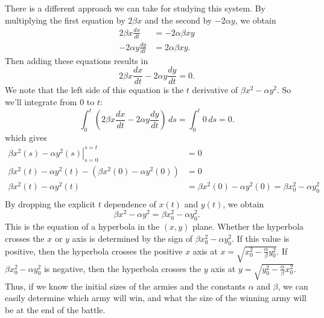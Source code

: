 \documentclass[reqno]{immbook}
\numberwithin{equation}{chapter}
\numberwithin{question}{section}
\numberwithin{theorem}{chapter}
\numberwithin{figure}{chapter}
\theoremstyle{definition}
\begin{document}
There is a different approach we can take for studying
this system.
By multiplying the first equation by $2\beta x$ and the
second by $-2\alpha y$, we obtain
\begin{equation}
\begin{split}
 2\beta x\frac{dx}{dt} & = -2 \alpha \beta x y \\
 -2\alpha y\frac{dy}{dt} & = 2 \alpha \beta x y.
\end{split}
\end{equation}
Then adding these equations results in
\begin{equation}
   2\beta x\frac{dx}{dt} -2\alpha y\frac{dy}{dt} = 0.
\end{equation}
We note that the left side of this equation is
the $t$ derivative of $\beta x^2 - \alpha y^2$.
So we'll integrate from $0$ to $t$:
\begin{equation}
   \int_0^t \left(2\beta x\frac{dx}{dt} -2\alpha y\frac{dy}{dt}\right)\, ds = \int_0^t 0 \, ds = 0.
\end{equation}
which gives
\begin{equation}
\begin{split}
  \left.\beta x^2(s) - \alpha y^2(s)\right|_{s=0}^{s=t} & = 0 \\
   \beta x^2(t) - \alpha y^2(t) - (\beta x^2(0) - \alpha y^2(0)) & = 0 \\
      \beta x^2(t) - \alpha y^2(t) & = \beta x^2(0) - \alpha y^2(0) =
         \beta x_0^2 - \alpha y_0^2 \\
\end{split}
\end{equation}
By dropping the explicit $t$ dependence of $x(t)$
and $y(t)$, we obtain
\begin{equation}
   \beta x^2 - \alpha y^2 = \beta x_0^2 - \alpha y_0^2.
   \label{eqn:lanchester_hyperbola}
\end{equation}
This is the equation of a hyperbola in the $(x,y)$ plane.
Whether the hyperbola crosses the $x$ or $y$ axis is
determined by the sign of
$\beta x_0^2 - \alpha y_0^2$.
If this value is positive, then the hyperbola
crosses the positive $x$ axis
at $x=\sqrt{x_0^2 - \frac{\alpha}{\beta} y_0^2}$.
If $\beta x_0^2 - \alpha y_0^2$
is negative, then the hyperbola
crosses the $y$ axis at
$y = \sqrt{y_0^2 - \frac{\alpha}{\beta} x_0^2}$.
Thus, if we know the initial sizes of the armies
and the constants $\alpha$ and $\beta$, we can
easily determine which army will win, and what the
size of the winning army will be at the end of the
battle.
\end{document}
